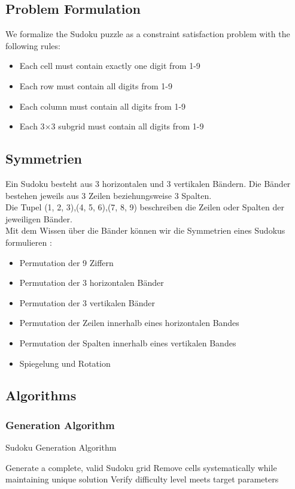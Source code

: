 \documentclass[12pt,a4paper]{article}
\begin{document}
\subsection{Problem Formulation}
We formalize the Sudoku puzzle as a constraint satisfaction problem with the following rules:
\begin{itemize}
    \item Each cell must contain exactly one digit from 1-9
    \item Each row must contain all digits from 1-9
    \item Each column must contain all digits from 1-9
    \item Each 3×3 subgrid must contain all digits from 1-9
\end{itemize}

\subsection{Symmetrien}
Ein Sudoku besteht aus 3 horizontalen und 3 vertikalen Bändern. Die Bänder bestehen jeweils aus 3 Zeilen beziehungsweise 3 Spalten. \\
Die Tupel (1, 2, 3),(4, 5, 6),(7, 8, 9) beschreiben die Zeilen oder Spalten der jeweiligen Bänder. \\
Mit dem Wissen über die Bänder können wir die Symmetrien eines Sudokus formulieren \cite{russell2006mathematics}: \\
\begin{itemize}
    \item Permutation der 9 Ziffern
    \item Permutation der 3 horizontalen Bänder
    \item Permutation der 3 vertikalen Bänder
    \item Permutation der Zeilen innerhalb eines horizontalen Bandes
    \item Permutation der Spalten innerhalb eines vertikalen Bandes
    \item Spiegelung und Rotation
\end{itemize}

\subsection{Algorithms}
\subsubsection{Generation Algorithm}
\begin{algorithm}
\caption{Sudoku Generation Algorithm}
\begin{algorithmic}[1]
\State Generate a complete, valid Sudoku grid
\State Remove cells systematically while maintaining unique solution
\State Verify difficulty level meets target parameters
\end{algorithmic}
\end{algorithm}
\end{document}
